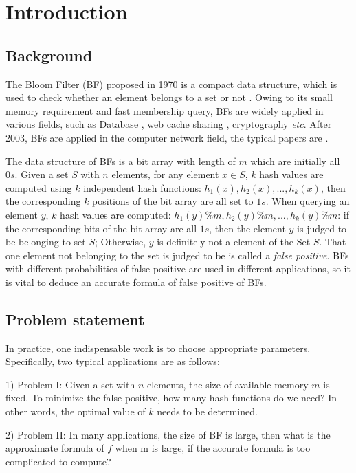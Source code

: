 \section{Introduction}

\subsection{Background}
The Bloom Filter (BF) proposed in 1970 is a compact data structure, which is used to check whether an element belongs to a set or not \cite{BF1970}. Owing to its small memory requirement and fast membership query, BFs are widely applied in various fields, such as Database \cite{DatabaseFile,DatabaseText}, web cache sharing \cite{webcaching}, cryptography \cite{encrypt} \textit{etc}. After 2003, BFs are applied in the computer network field, the typical papers are \cite{sig03PBF, yuConext09, BFDanLi, BF_TC, HASH-100G}.

The data structure of BFs is a bit array with length of $m$ which are initially all $0s$. 
Given a set $S$ with $n$ elements, for any element $x\in S$, $k$ hash values are computed using $k$ independent hash functions: $h_1(x), h_2(x),..., h_k(x)$, then the corresponding $k$ positions of the bit array are all set to $1s$. When querying an element $y$, $k$ hash values are computed: $h_1(y) \% m, h_2(y) \% m,..., h_k(y) \% m$: if the corresponding bits of the bit array are all $1s$, then the element $y$ is judged to be belonging to set $S$; Otherwise, $y$ is definitely not a element of the Set $S$. That one element not belonging to the set is judged to be is called a \textit{false positive}. BFs with different probabilities of false positive are used in different applications, so it is vital to deduce an accurate formula of false positive of BFs. 

\subsection{Problem statement}
In practice, one indispensable work is to choose appropriate parameters. Specifically, two typical applications are as follows:

1) Problem I: Given a set with $n$ elements, the size of available memory $m$ is fixed. To minimize the false positive, how many hash functions do we need? In other words, the optimal value of $k$ needs to be determined. 

2) Problem II: In many applications, the size of BF is large, then what is the approximate formula of $f$ when m is large, if the accurate formula is too complicated to compute?

